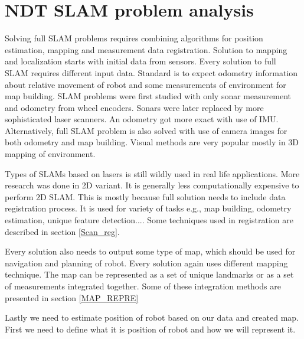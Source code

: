 \chapter{NDT SLAM problem analysis}

Solving full \gls{SLAM} problems requires combining algorithms for position estimation, mapping and measurement data registration. 
Solution to mapping and localization starts with initial data from sensors. Every solution to full SLAM requires different input data. Standard is to expect odometry information about relative movement of robot and some measurements of environment for map building. \gls{SLAM} problems were first studied with only sonar measurement and odometry from wheel encoders. Sonars were later replaced by more sophisticated laser scanners. An odometry got more exact with use of \gls{IMU}. Alternatively, full \gls{SLAM} problem is also solved with use of camera images for both odometry and map building. Visual methods are very popular mostly in 3D mapping of environment. 

Types of \gls{SLAM}s based on lasers is still wildly used in real life applications. More research was done in 2D variant. It is generally less computationally expensive to perform 2D \gls{SLAM}. This is mostly because full solution needs to include data registration process. It is used for variety of tasks e.g., map building, odometry estimation, unique feature detection.... Some techniques used in registration are described in section \ref{Scan_reg}.

Every solution also needs to output some type of map, which should be used for navigation and planning of robot. Every solution again uses different mapping technique. The map can be represented as a set of unique landmarks or as a set of measurements integrated together. Some of these integration methods are presented in section \ref{MAP_REPRE}

Lastly we need to estimate position of robot based on our data and created map. First we need to define what it is position of robot and how we will represent it.   
